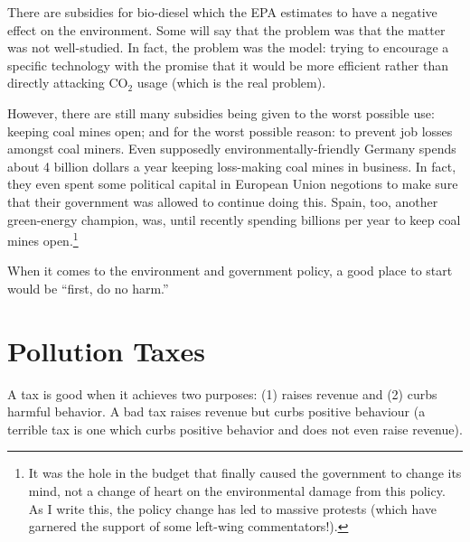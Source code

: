 
There are subsidies for bio-diesel which the EPA estimates to have a negative
effect on the environment. Some will say that the problem was that the matter was not well-studied.
In fact, the problem was the model: trying to encourage a specific technology
with the promise that it would be more efficient rather than directly attacking
CO${}_2$ usage (which is the real problem).

However, there are still many subsidies being given to the worst possible use:
keeping coal mines open; and for the worst possible reason: to prevent job
losses amongst coal miners. Even supposedly environmentally-friendly Germany
spends about 4 billion dollars a year keeping loss-making coal mines in
business. In fact, they even spent some political capital in European Union
negotions to make sure that their government was allowed to continue doing
this. Spain, too, another green-energy champion, was, until recently spending
billions per year to keep coal mines open.\footnote{It was the hole in the
budget that finally caused the government to change its mind, not a change of
heart on the environmental damage from this policy. As I write this, the policy
change has led to massive protests (which have garnered the support of some
left-wing commentators!).}

When it comes to the environment and government policy, a good place to start
would be ``first, do no harm.''


\section{Pollution Taxes}

A tax is good when it achieves two purposes: (1) raises revenue and (2) curbs
harmful behavior. A bad tax raises revenue but curbs positive behaviour (a
terrible tax is one which curbs positive behavior and does not even raise
revenue).

